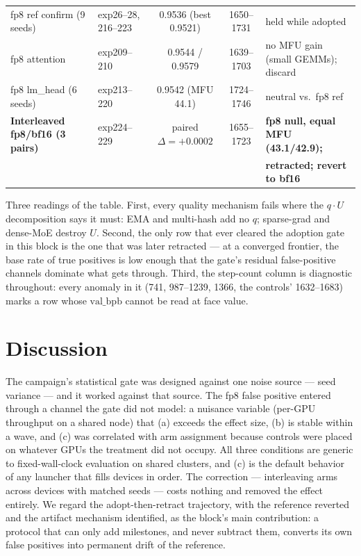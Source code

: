 \documentclass{article}
\newcommand{\valbpb}{\mathrm{val\_bpb}}
\begin{document}
\begin{table}[t]
\begin{center}
\begin{small}
{\begin{tabular}{llccl}
\quad fp8 ref confirm (9 seeds) & exp26--28, 216--223 & 0.9536 (best 0.9521) & 1650--1731 & held while adopted \\
fp8 attention & exp209--210 & 0.9544 / 0.9579 & 1639--1703 & no MFU gain (small GEMMs); discard \\
fp8 lm\_head (6 seeds) & exp213--220 & 0.9542 (MFU 44.1) & 1724--1746 & neutral vs.\ fp8 ref \\
\textbf{Interleaved fp8/bf16 (3 pairs)} & exp224--229 & paired $\Delta = +0.0002$ & 1655--1723 & \textbf{fp8 null, equal MFU (43.1/42.9);} \\
 & & & & \textbf{retracted; revert to bf16} \\
\bottomrule
\end{tabular}}
\end{small}
\end{center}
\vskip -0.1in
\end{table}

Three readings of the table. First, every quality mechanism fails where the $q \cdot U$ decomposition says it must: EMA and multi-hash add no $q$; sparse-grad and dense-MoE destroy $U$. Second, the only row that ever cleared the adoption gate in this block is the one that was later retracted --- at a converged frontier, the base rate of true positives is low enough that the gate's residual false-positive channels dominate what gets through. Third, the step-count column is diagnostic throughout: every anomaly in it (741, 987--1239, 1366, the controls' 1632--1683) marks a row whose $\valbpb$ cannot be read at face value.

\section{Discussion}
\label{sec:discussion}

The campaign's statistical gate was designed against one noise source --- seed variance --- and it worked against that source. The fp8 false positive entered through a channel the gate did not model: a nuisance variable (per-GPU throughput on a shared node) that (a) exceeds the effect size, (b) is stable within a wave, and (c) was correlated with arm assignment because controls were placed on whatever GPUs the treatment did not occupy. All three conditions are generic to fixed-wall-clock evaluation on shared clusters, and (c) is the default behavior of any launcher that fills devices in order. The correction --- interleaving arms across devices with matched seeds --- costs nothing and removed the effect entirely. We regard the adopt-then-retract trajectory, with the reference reverted and the artifact mechanism identified, as the block's main contribution: a protocol that can only add milestones, and never subtract them, converts its own false positives into permanent drift of the reference.
\end{document}
